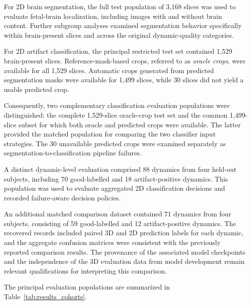 For 2D brain segmentation, the full test population of 3,168 slices was used to evaluate fetal-brain localization, including images with and without brain content. Further subgroup analyses examined segmentation behavior specifically within brain-present slices and across the original dynamic-quality categories.

For 2D artifact classification, the principal restricted test set contained 1,529 brain-present slices. Reference-mask-based crops, referred to as \emph{oracle crops}, were available for all 1,529 slices. Automatic crops generated from predicted segmentation masks were available for 1,499 slices, while 30 slices did not yield a usable predicted crop.

Consequently, two complementary classification evaluation populations were distinguished: the complete 1,529-slice oracle-crop test set and the common 1,499-slice subset for which both oracle and predicted crops were available. The latter provided the matched population for comparing the two classifier input strategies. The 30 unavailable predicted crops were examined separately as segmentation-to-classification pipeline failures.

A distinct dynamic-level evaluation comprised 88 dynamics from four held-out subjects, including 70 good-labelled and 18 artifact-positive dynamics. This population was used to evaluate aggregated 2D classification decisions and recorded failure-aware decision policies.

An additional matched comparison dataset contained 71 dynamics from four subjects, consisting of 59 good-labelled and 12 artifact-positive dynamics. The recovered records included paired 3D and 2D prediction labels for each dynamic, and the aggregate confusion matrices were consistent with the previously reported comparison results. The provenance of the associated model checkpoints and the independence of the 3D evaluation data from model development remain relevant qualifications for interpreting this comparison.

The principal evaluation populations are summarized in Table~\ref{tab:results_cohorts}.


